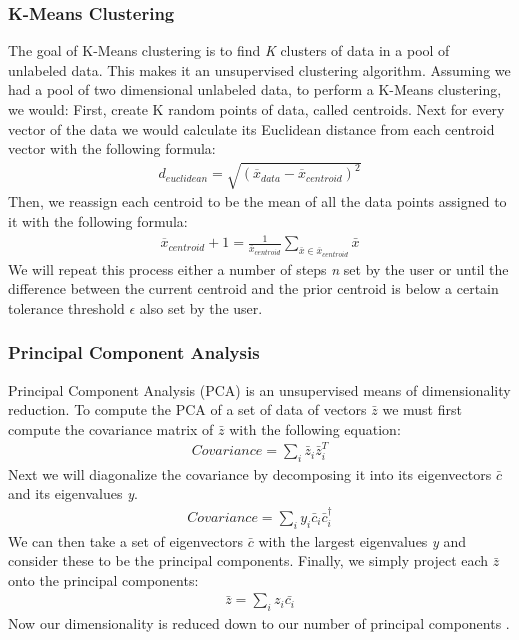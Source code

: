 \documentclass[conference]{IEEEtran}
\begin{document}
\subsubsection{K-Means Clustering}
The goal of K-Means clustering is to find \emph{K} clusters of data in a pool of unlabeled data. This makes it an unsupervised clustering algorithm. Assuming we had a pool of two dimensional unlabeled data, to perform a K-Means clustering, we would: First, create K random points of data, called centroids. Next for every vector of the data we would calculate its Euclidean distance from each centroid vector with the following formula:
\begin{align*}
d_{euclidean} = \sqrt{(\overline{x}_{data} - \overline{x}_{centroid})^2}
\end{align*}
Then, we reassign each centroid to be the mean of all the data points assigned to it with the following formula:
\begin{align*}
\overline{x}_{centroid} + 1 = \frac{1}{\overline{x}_{centroid}}  \sum_{\bar{x}\in\overline{x}_{centroid}} \bar{x}
\end{align*}
We will repeat this process either a number of steps \emph{n} set by the user or until the difference between the current centroid and the prior centroid is below a certain tolerance threshold $\epsilon$ also set by the user\cite{b10}. 
\subsubsection{Principal Component Analysis}
Principal Component Analysis (PCA) is an unsupervised means of dimensionality reduction. To compute the PCA of a set of data of vectors $\bar{z}$ we must first compute the covariance matrix of $\bar{z}$ with the following equation:
\begin{align*}
Covariance = \sum_i \bar{z}_i\bar{z}^T_i
\end{align*}
\indent Next we will diagonalize the covariance by decomposing it into its eigenvectors \emph{$\bar{c}$} and its eigenvalues \emph{{y}}.
\begin{align*}
Covariance = \sum_i y_i\bar{c}_i\bar{c}_i^\dagger
\end{align*}
\indent We can then take a set of eigenvectors \emph{$\bar{c}$} with the largest eigenvalues \emph{{y}} and consider these to be the principal components. Finally, we simply project each $\bar{z}$ onto the principal components: 
\begin{align*}
    \bar{z} = \sum_i z_i \bar{c_i}
\end{align*}
Now our dimensionality is reduced down to our number of principal components \cite{b7}. 
\end{document}
